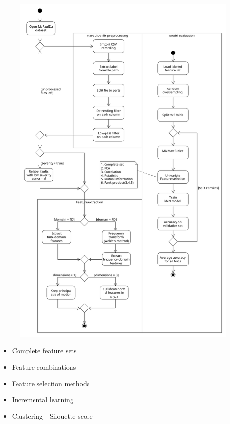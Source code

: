 \begin{figure}[h]
    \centering
	\includegraphics[width=\textwidth]{assets/design/pipeline-design.png}
\end{figure} 


\begin{itemize}
\item Complete feature sets
\item Feature combinations
\item Feature selection methods
\item Incremental learning
\item Clustering - Silouette score
\end{itemize}


